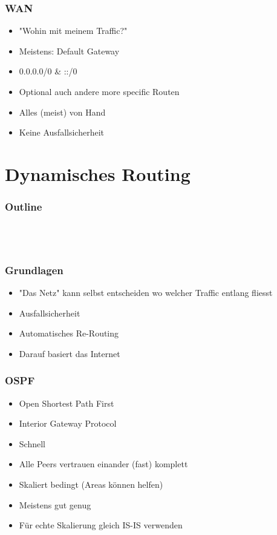 \documentclass[t]{beamer}
\begin{document}
\begin{frame}
	\frametitle{WAN}
	\begin{itemize}
		\item "Wohin mit meinem Traffic?"
		\item Meistens: Default Gateway
		\item 0.0.0.0/0 \& ::/0
		\item Optional auch andere more specific Routen
		\item Alles (meist) von Hand
		\item Keine Ausfallsicherheit
	\end{itemize}
\end{frame}


\section{Dynamisches Routing}

\begin{frame}
	\frametitle{Outline}
	\tableofcontents[currentsection]
\end{frame}

\subsection{\ }

\begin{frame}
	\frametitle{Grundlagen}
	\begin{itemize}
		\item "Das Netz" kann selbst entscheiden wo welcher Traffic entlang fliesst
		\item Ausfallsicherheit
		\item Automatisches Re-Routing
		\item Darauf basiert das Internet
	\end{itemize}
\end{frame}

\begin{frame}
	\frametitle{OSPF}
	\begin{itemize}
		\item Open Shortest Path First
		\item Interior Gateway Protocol
		\item Schnell
		\item Alle Peers vertrauen einander (fast) komplett
		\item Skaliert bedingt (Areas k\"onnen helfen)
		\item Meistens gut genug
		\item F\"ur echte Skalierung gleich IS-IS verwenden
	\end{itemize}
\end{frame}
\end{document}
